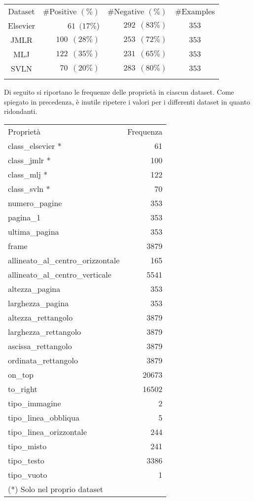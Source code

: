 \begin{table}[htbp]
	\label{tab:datasets}
	\centering
\begin{tabular}{c@{\qquad}r@{\qquad}r@{\qquad}c}
\toprule
\addlinespace
Dataset & \#Positive $(\%)$ & \#Negative $(\%)$ & \#Examples \\
\addlinespace
\midrule
\addlinespace
Elsevier & $61~~(17\%$) & $292~~(83\%)$ & $353$ \\
JMLR     & $100~~(28\%)$ & $253~~(72\%)$ & $353$ \\
MLJ      & $122~~(35\%)$ & $231~~(65\%)$ & $353$ \\
SVLN     & $70~~(20\%)$ & $283~~(80\%)$ & $353$ \\
\addlinespace
\bottomrule
\end{tabular}
\end{table}

Di seguito si riportano le frequenze delle proprietà in ciascun dataset. Come spiegato in precedenza, è inutile ripetere i valori per i differenti dataset in quanto ridondanti.

\begin{table}[h!tbp]
\centering
\label{tab:frequenzaProprietà}
\small\begin{tabular}{lr}
\toprule
\addlinespace
Proprietà & Frequenza \\
\addlinespace
\midrule
\addlinespace
class\_elsevier * & 61 \\
class\_jmlr * & 100 \\
class\_mlj * & 122 \\
class\_svln * & 70 \\
numero\_pagine & 353 \\
pagina\_1 & 353 \\
ultima\_pagina & 353 \\
frame & 3879 \\
allineato\_al\_centro\_orizzontale & 165 \\
allineato\_al\_centro\_verticale & 5541 \\
altezza\_pagina & 353 \\
larghezza\_pagina & 353 \\
altezza\_rettangolo & 3879 \\
larghezza\_rettangolo & 3879 \\
ascissa\_rettangolo & 3879 \\
ordinata\_rettangolo & 3879 \\
on\_top & 20673 \\
to\_right & 16502 \\
tipo\_immagine & 2 \\
tipo\_linea\_obbliqua & 5 \\
tipo\_linea\_orizzontale & 244 \\
tipo\_misto & 241 \\
tipo\_testo & 3386 \\
tipo\_vuoto & 1 \\
\addlinespace
\bottomrule
\addlinespace
(*) Solo nel proprio dataset & \\
\end{tabular}
\end{table}



